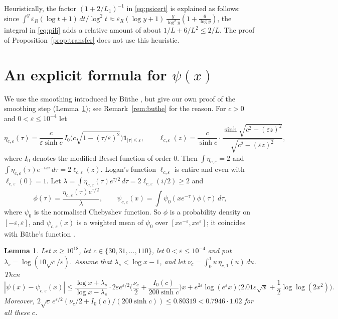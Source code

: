 \documentclass[11pt]{amsart}
\numberwithin{equation}{section}
\newtheorem{lemma}[theorem]{Lemma}
\theoremstyle{definition}
\theoremstyle{remark}
\newcommand{\eps}{\varepsilon}
\begin{document}
Heuristically, the factor $(1 + 2/L_1)^{-1}$ in \eqref{eq:psicert} is explained as follows: since $\int^y\eps_R(\log t + 1)\,dt/\log^2t \approx \eps_R(\log y + 1)\,\frac{y}{\log^2y}(1 + \frac{6}{\log y})$, the integral in \eqref{eq:pili} adds a relative amount of about $1/L + 6/L^2 \leq 2/L$.
The proof of Proposition~\ref{prop:transfer} does not use this heuristic.

\section{An explicit formula for \texorpdfstring{$\psi(x)$}{psi(x)}}\label{sec:explicit}

We use the smoothing introduced by B\"uthe \cite{Buthe2016,Buthe2018}, but give our own proof of the smoothing step (Lemma~\ref{lem:smooth}); see Remark~\ref{rem:buthe} for the reason.
For $c > 0$ and $0 < \eps \leq 10^{-4}$ let
\[
\eta_{c,\eps}(\tau) = \frac{c}{\eps\sinh c}\,I_0\Big(c\sqrt{1 - (\tau/\eps)^2}\Big)\mathbf 1_{|\tau|\leq\eps}, \qquad
\ell_{c,\eps}(z) = \frac{c}{\sinh c}\cdot\frac{\sinh\sqrt{c^2 - (\eps z)^2}}{\sqrt{c^2 - (\eps z)^2}},
\]
where $I_0$ denotes the modified Bessel function of order $0$.
Then $\int\eta_{c,\eps} = 2$ and $\int\eta_{c,\eps}(\tau)e^{-iz\tau}\,d\tau = 2\ell_{c,\eps}(z)$.
Logan's function $\ell_{c,\eps}$ is entire and even with $\ell_{c,\eps}(0) = 1$.
Let $\lambda = \int\eta_{c,\eps}(\tau)e^{\tau/2}\,d\tau = 2\ell_{c,\eps}(i/2) \geq 2$ and
\begin{equation}\label{eq:phi}
\phi(\tau) = \frac{\eta_{c,\eps}(\tau)e^{\tau/2}}{\lambda}, \qquad \psi_{c,\eps}(x) = \int\psi_0(xe^{-\tau})\phi(\tau)\,d\tau,
\end{equation}
where $\psi_0$ is the normalised Chebyshev function.
So $\phi$ is a probability density on $[-\eps,\eps]$, and $\psi_{c,\eps}(x)$ is a weighted mean of $\psi_0$ over $[xe^{-\eps}, xe^{\eps}]$; it coincides with B\"uthe's function \cite[(3.2)--(3.4)]{Buthe2018}.

\begin{lemma}\label{lem:smooth}
Let $x \geq 10^{18}$, let $c \in \{30, 31, \ldots, 110\}$, let $0 < \eps \leq 10^{-4}$ and put $\lambda_s = \log(10\sqrt c/\eps)$.
Assume that $\lambda_s < \log x - 1$, and let $\nu_c = \int_0^1 u\,\eta_{c,1}(u)\,du$.
Then
\begin{equation}\label{eq:smooth}
|\psi(x) - \psi_{c,\eps}(x)| \leq \frac{\log x + \lambda_s}{\log x - \lambda_s}\cdot 2\eps e^{\eps/2}\Big(\frac{\nu_c}2 + \frac{I_0(c)}{200\sinh c}\Big)x + e^{2\eps}\log(e^\eps x)\Big(2.01\eps\sqrt x + \frac12\log\log(2x^2)\Big).
\end{equation}
Moreover, $2\sqrt c\,e^{\eps/2}(\nu_c/2 + I_0(c)/(200\sinh c)) \leq 0.80319 < 0.7946\cdot 1.02$ for all these $c$.
\end{lemma}
\end{document}
